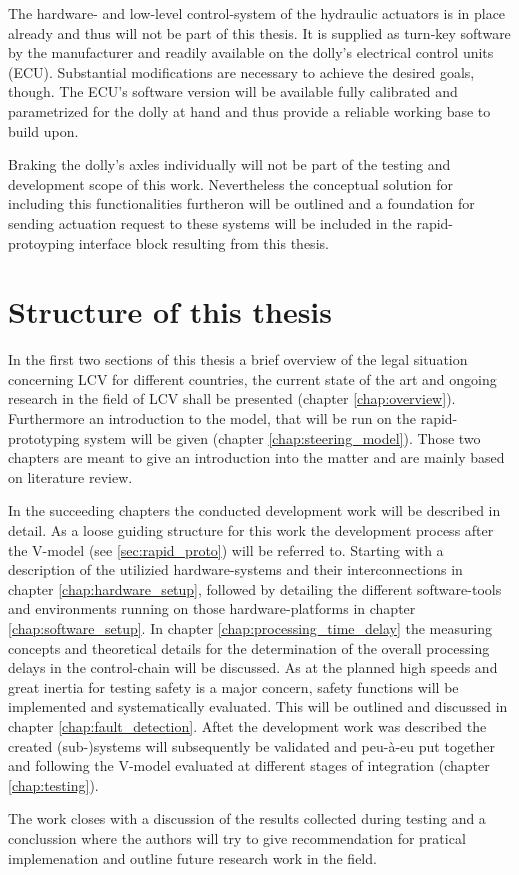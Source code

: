 \documentclass[ExampleMasters.tex]{subfiles}
\begin{document}
The hardware- and low-level control-system of the hydraulic actuators is in place already and thus will not be part of this thesis. It is supplied as turn-key software by the manufacturer and readily available on the dolly's electrical control units (ECU). Substantial modifications are necessary to achieve the desired goals, though. The ECU's software version will be available fully calibrated and parametrized for the dolly at hand and thus provide a reliable working base to build upon. 

Braking the dolly's axles individually will not be part of the testing and development scope of this work. Nevertheless the conceptual solution for including this functionalities furtheron will be outlined and a foundation for sending actuation request to these systems will be included in the rapid-protoyping interface block resulting from this thesis. 


\section{Structure of this thesis}
\label{sec:structure}

In the first two sections of this thesis a brief overview of the legal situation concerning LCV for different countries, the current state of the art and ongoing research in the field of LCV shall be presented (chapter \ref{chap:overview}). Furthermore an introduction to the model, that will be run on the rapid-prototyping system will be given (chapter \ref{chap:steering_model}). Those two chapters are meant to give an introduction into the matter and are mainly based on literature review. 

In the succeeding chapters the conducted development work will be described in detail. As a loose guiding structure for this work the development process after the V-model (see \ref{sec:rapid_proto}) will be referred to. Starting with a description of the utilizied hardware-systems and their interconnections in chapter \ref{chap:hardware_setup}, followed by detailing the different software-tools and environments running on those hardware-platforms in chapter \ref{chap:software_setup}. In chapter \ref{chap:processing_time_delay} the measuring concepts and theoretical details for the determination of the overall processing delays in the control-chain will be discussed. As at the planned high speeds and great inertia for testing safety is a major concern, safety functions will be implemented and systematically evaluated. This will be outlined and discussed in chapter \ref{chap:fault_detection}. Aftet the development work was described the created (sub-)systems will subsequently be validated and peu-\`{a}-eu put together and following the V-model evaluated at different stages of integration (chapter \ref{chap:testing}). 

The work closes with a discussion of the results collected during testing and a conclussion where the authors will try to give recommendation for pratical implemenation and outline future research work in the field.
\end{document}
